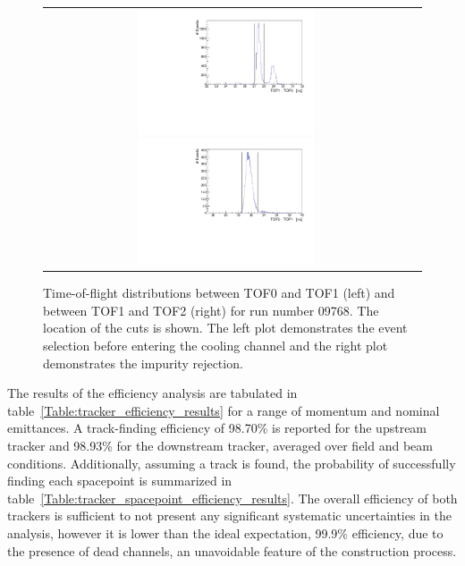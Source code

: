 \begin{figure}[ht]
	\centering
    \begin{tabular}{cc}
    	\includegraphics[width=0.5\textwidth]{efficiency_tof1_selection.pdf}%
    	\includegraphics[width=0.5\textwidth]{efficiency_tof2_selection.pdf}
    \end{tabular}
    \caption{\label{Figure:efficiency_tof_plots}Time-of-flight distributions between TOF0 and TOF1 (left) and between TOF1 and TOF2 (right) for run number 09768. The location of the cuts is shown. The left plot demonstrates the event selection before entering the cooling channel and the right plot demonstrates the impurity rejection.}
\end{figure}

The results of the efficiency analysis are tabulated in table~\ref{Table:tracker_efficiency_results} for a range of momentum and nominal emittances. A track-finding efficiency of 98.70\% is reported for the upstream tracker and 98.93\% for the downstream tracker, averaged over field and beam conditions. Additionally, assuming a track is found, the probability of successfully finding each spacepoint is summarized in table~\ref{Table:tracker_spacepoint_efficiency_results}. The overall efficiency of both trackers is sufficient to not present any significant systematic uncertainties in the analysis, however it is lower than the ideal expectation, 99.9\% efficiency, due to the presence of dead channels, an unavoidable feature of the construction process.

